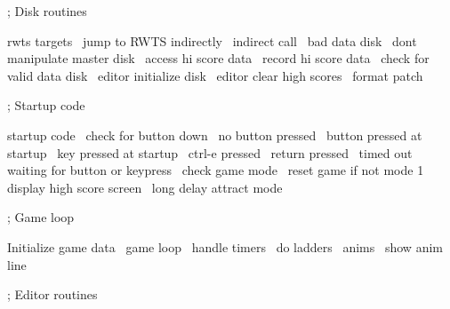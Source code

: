\documentclass[10pt]{report}%
\begin{document}
    ; Disk routines

    \LA{}rwts targets~{\nwtagstyle{}}\RA{}
    \LA{}jump to RWTS indirectly~{\nwtagstyle{}}\RA{}
    \LA{}indirect call~{\nwtagstyle{}}\RA{}
    \LA{}bad data disk~{\nwtagstyle{}}\RA{}
    \LA{}dont manipulate master disk~{\nwtagstyle{}}\RA{}
    \LA{}access hi score data~{\nwtagstyle{}}\RA{}
    \LA{}record hi score data~{\nwtagstyle{}}\RA{}
    \LA{}check for valid data disk~{\nwtagstyle{}}\RA{}
    \LA{}editor initialize disk~{\nwtagstyle{}}\RA{}
    \LA{}editor clear high scores~{\nwtagstyle{}}\RA{}
    \LA{}format patch~{\nwtagstyle{}}\RA{}

    ; Startup code

    \LA{}startup code~{\nwtagstyle{}}\RA{}
    \LA{}check for button down~{\nwtagstyle{}}\RA{}
    \LA{}no button pressed~{\nwtagstyle{}}\RA{}
    \LA{}button pressed at startup~{\nwtagstyle{}}\RA{}
    \LA{}key pressed at startup~{\nwtagstyle{}}\RA{}
    \LA{}ctrl-e pressed~{\nwtagstyle{}}\RA{}
    \LA{}return pressed~{\nwtagstyle{}}\RA{}
    \LA{}timed out waiting for button or keypress~{\nwtagstyle{}}\RA{}
    \LA{}check game mode~{\nwtagstyle{}}\RA{}
    \LA{}reset game if not mode 1~{\nwtagstyle{}}\RA{}
    \LA{}display high score screen~{\nwtagstyle{}}\RA{}
    \LA{}long delay attract mode~{\nwtagstyle{}}\RA{}

    ; Game loop

    \LA{}Initialize game data~{\nwtagstyle{}}\RA{}
    \LA{}game loop~{\nwtagstyle{}}\RA{}
    \LA{}handle timers~{\nwtagstyle{}}\RA{}
    \LA{}do ladders~{\nwtagstyle{}}\RA{}
    \LA{}anims~{\nwtagstyle{}}\RA{}
    \LA{}show anim line~{\nwtagstyle{}}\RA{}

    ; Editor routines
\end{document}
